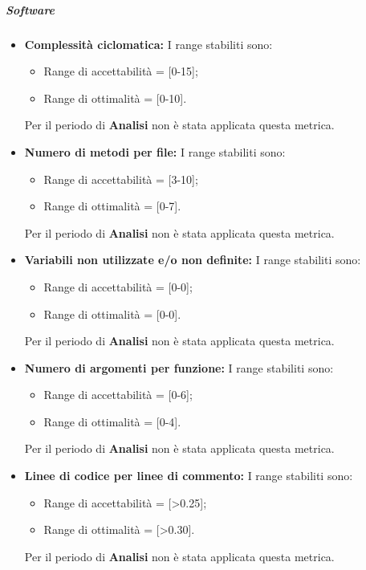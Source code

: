 \subparagraph{Software}
\begin{itemize}
\item \textbf{Complessità ciclomatica: }I range stabiliti sono:
      \begin{itemize}
        \item Range di accettabilità = [0-15];
        \item Range di ottimalità = [0-10].
      \end{itemize}
Per il periodo di \textbf{Analisi} non è stata applicata questa metrica.

\item \textbf{Numero di metodi per file: }I range stabiliti sono:
      \begin{itemize}
        \item Range di accettabilità = [3-10];
        \item Range di ottimalità = [0-7].
      \end{itemize}
Per il periodo di \textbf{Analisi} non è stata applicata questa metrica.

\item \textbf{Variabili non utilizzate e/o non definite: }I range stabiliti sono:
      \begin{itemize}
        \item Range di accettabilità = [0-0];
        \item Range di ottimalità = [0-0].
      \end{itemize}
Per il periodo di \textbf{Analisi} non è stata applicata questa metrica.

\item \textbf{Numero di argomenti per funzione: }I range stabiliti sono:
      \begin{itemize}
        \item Range di accettabilità = [0-6];
        \item Range di ottimalità = [0-4].
      \end{itemize}
Per il periodo di \textbf{Analisi} non è stata applicata questa metrica.

\item \textbf{Linee di codice per linee di commento: } I range stabiliti sono:
      \begin{itemize}
        \item Range di accettabilità = [>0.25];
        \item Range di ottimalità = [>0.30].
      \end{itemize}
Per il periodo di \textbf{Analisi} non è stata applicata questa metrica.
\end{itemize}

